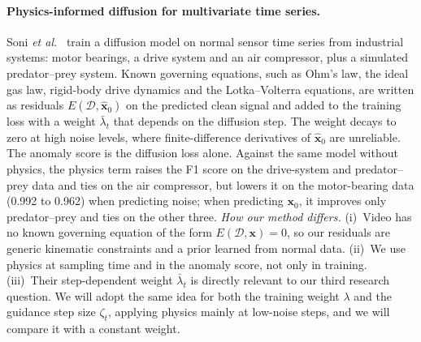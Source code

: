 \documentclass[11pt,a4paper]{article}
\begin{document}
\paragraph{Physics-informed diffusion for multivariate time series.}
Soni \emph{et al.}~\cite{soni2025pidm} train a diffusion model on normal sensor time series from industrial systems: motor bearings, a drive system and an air compressor, plus a simulated predator--prey system. Known governing equations, such as Ohm's law, the ideal gas law, rigid-body drive dynamics and the Lotka--Volterra equations, are written as residuals $E(\mathcal{D},\hat{\mathbf{x}}_0)$ on the predicted clean signal and added to the training loss with a weight $\bar\lambda_t$ that depends on the diffusion step. The weight decays to zero at high noise levels, where finite-difference derivatives of $\hat{\mathbf{x}}_0$ are unreliable. The anomaly score is the diffusion loss alone. Against the same model without physics, the physics term raises the F1 score on the drive-system and predator--prey data and ties on the air compressor, but lowers it on the motor-bearing data (0.992 to 0.962) when predicting noise; when predicting $\mathbf{x}_0$, it improves only predator--prey and ties on the other three.
\emph{How our method differs.}
(i)~Video has no known governing equation of the form $E(\mathcal{D},\mathbf{x})=0$, so our residuals are generic kinematic constraints and a prior learned from normal data.
(ii)~We use physics at sampling time and in the anomaly score, not only in training.
(iii)~Their step-dependent weight $\bar\lambda_t$ is directly relevant to our third research question. We will adopt the same idea for both the training weight $\lambda$ and the guidance step size $\zeta_t$, applying physics mainly at low-noise steps, and we will compare it with a constant weight.
\end{document}
